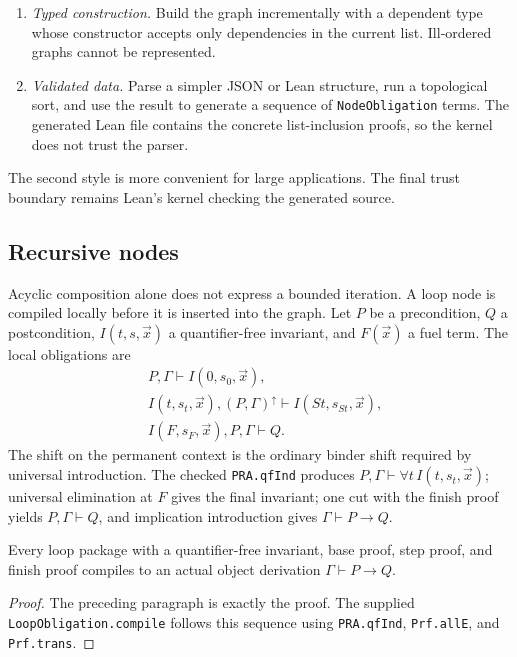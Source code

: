 \begin{enumerate}
  \item \emph{Typed construction.}  Build the graph incrementally with a dependent type whose constructor
        accepts only dependencies in the current list.  Ill-ordered graphs cannot be represented.
  \item \emph{Validated data.}  Parse a simpler JSON or Lean structure, run a topological sort, and use the
        result to generate a sequence of \texttt{NodeObligation} terms.  The generated Lean file contains
        the concrete list-inclusion proofs, so the kernel does not trust the parser.
\end{enumerate}
The second style is more convenient for large applications.  The final trust boundary remains Lean's
kernel checking the generated source.

\subsection{Recursive nodes}

Acyclic composition alone does not express a bounded iteration.  A loop node is compiled locally before it
is inserted into the graph.  Let \(P\) be a precondition, \(Q\) a postcondition, \(I(t,s,\vec x)\) a
quantifier-free invariant, and \(F(\vec x)\) a fuel term.  The local obligations are
\begin{align*}
  &P,\Gamma\vdash I(0,s_0,\vec x),\\
  &I(t,s_t,\vec x),(P,\Gamma)^{\uparrow}
        \vdash I(St,s_{St},\vec x),\\
  &I(F,s_F,\vec x),P,\Gamma\vdash Q.
\end{align*}
The shift on the permanent context is the ordinary binder shift required by universal introduction.  The
checked \texttt{PRA.qfInd} produces \(P,\Gamma\vdash\forall t\,I(t,s_t,\vec x)\); universal elimination at
\(F\) gives the final invariant; one cut with the finish proof yields \(P,\Gamma\vdash Q\), and implication
introduction gives \(\Gamma\vdash P\to Q\).

\begin{theorem}
\label{thm:loop-compile}
Every loop package with a quantifier-free invariant, base proof, step proof, and finish proof compiles to an
actual object derivation \(\Gamma\vdash P\to Q\).
\end{theorem}
\begin{proof}
The preceding paragraph is exactly the proof.  The supplied \texttt{LoopObligation.compile} follows this
sequence using \texttt{PRA.qfInd}, \texttt{Prf.allE}, and \texttt{Prf.trans}.
\end{proof}

